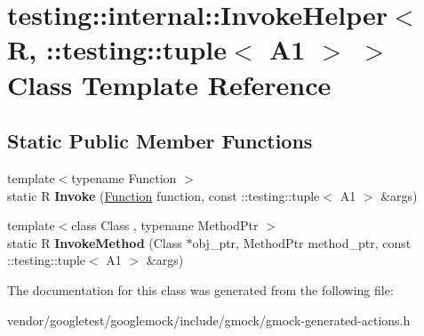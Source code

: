 \hypertarget{classtesting_1_1internal_1_1_invoke_helper_3_01_r_00_01_1_1testing_1_1tuple_3_01_a1_01_4_01_4}{}\section{testing\+:\+:internal\+:\+:Invoke\+Helper$<$ R, \+:\+:testing\+:\+:tuple$<$ A1 $>$ $>$ Class Template Reference}
\label{classtesting_1_1internal_1_1_invoke_helper_3_01_r_00_01_1_1testing_1_1tuple_3_01_a1_01_4_01_4}
\subsection*{Static Public Member Functions}
\begin{DoxyCompactItemize}
\item 
\mbox{\label{classtesting_1_1internal_1_1_invoke_helper_3_01_r_00_01_1_1testing_1_1tuple_3_01_a1_01_4_01_4_a162b9783d4904f5f45d4e677299cab0d}} 
{\footnotesize template$<$typename Function $>$ }\\static R {\bfseries Invoke} (\mbox{\hyperlink{structtesting_1_1internal_1_1_function}{Function}} function, const \+::testing\+::tuple$<$ A1 $>$ \&args)
\item 
\mbox{\label{classtesting_1_1internal_1_1_invoke_helper_3_01_r_00_01_1_1testing_1_1tuple_3_01_a1_01_4_01_4_a320389ba7ab6458aeb70c07a2c9e061b}} 
{\footnotesize template$<$class Class , typename Method\+Ptr $>$ }\\static R {\bfseries Invoke\+Method} (Class $\ast$obj\+\_\+ptr, Method\+Ptr method\+\_\+ptr, const \+::testing\+::tuple$<$ A1 $>$ \&args)
\end{DoxyCompactItemize}


The documentation for this class was generated from the following file\+:\begin{DoxyCompactItemize}
\item 
vendor/googletest/googlemock/include/gmock/gmock-\/generated-\/actions.\+h\end{DoxyCompactItemize}
